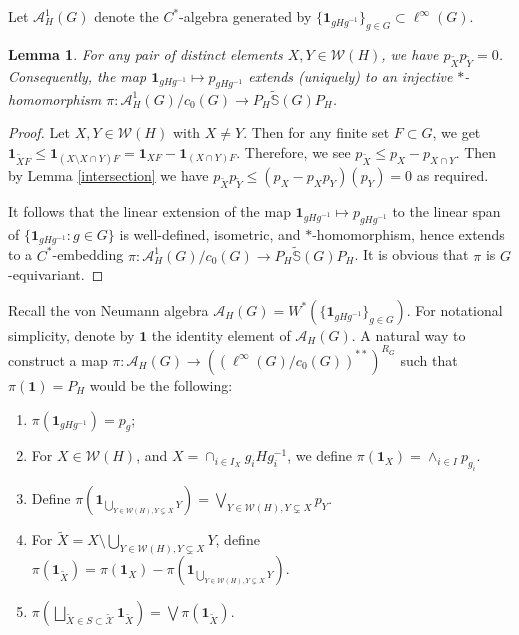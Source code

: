\documentclass[11pt]{amsart}
\newtheorem{lem}[thm]{Lemma}
\theoremstyle{definition}
\newcommand{\cX}{{\mathcal X}}
\begin{document}
 
Let $\mathcal{A}_{H}^{1}(G)$ denote the $C^*$-algebra generated by $\{ \mathbf{1}_{gHg^{-1}}\}_{g\in G}\subset \ell^\infty(G)$.   


\begin{lem}\label{pi extends}
For any pair of distinct elements $X,Y\in \mathcal{W}(H)$, we have $p_{\widetilde{X}}p_{\widetilde{Y}}=0$.
%
Consequently, the map $\mathbf{1}_{gHg^{-1}}\mapsto p_{gHg^{-1}}$ extends (uniquely) to an injective $*$-homomorphism $\pi: \mathcal{A}^{1}_H(G)/c_0(G)\to P_H\widetilde{\mathbb{S}}(G)P_H$.
\end{lem}
\begin{proof}
Let $X,Y\in \mathcal{W}(H)$ with $X\neq Y$. Then for any finite set $F\subset G$, we get  $\mathbf{1}_{\widetilde{X}F}\leq \mathbf{1}_{(X\setminus X\cap Y)F}=  \mathbf{1}_{XF}- \mathbf{1}_{(X\cap Y)F}$. Therefore, we see $p_{\widetilde{X}}\leq p_{X}- p_{X\cap Y}$.    Then by Lemma \ref{intersection} we have $p_{\widetilde{X}}p_{\widetilde{Y}}\leq (p_{X}-p_{X}p_{Y})(p_{Y})= 0$ as required.

It follows that the linear extension of the map $\mathbf{1}_{gHg^{-1}}\mapsto p_{gHg^{-1}}$ to the linear span of $\{\mathbf{1}_{gHg^{-1}}: g\in G\}$ is well-defined, isometric, and $*$-homomorphism, hence extends to a $C^*$-embedding $\pi: \mathcal{A}^{1}_H(G)/c_0(G)\to P_H\widetilde{\mathbb{S}}(G)P_H$.
It is obvious that $\pi$ is $G$-equivariant.
\end{proof}


Recall the von Neumann algebra $\mathcal{A}_H(G)= W^*(\{\mathbf{1}_{gHg^{-1}}\}_{g\in G})$. For notational simplicity, denote by $\mathbf{1}$ the identity element of $\mathcal{A}_H(G)$.  A natural way to construct a map $\pi: \mathcal{A}_H(G)\to
\left(\left(\ell^\infty(G)/c_0(G)\right)^{**}\right)^{R_G}$ such that $\pi(\mathbf{1})= P_{H}$ would be the following:


 

\begin{enumerate}
    \item $\pi(\mathbf{1}_{gHg^{-1}})= p_{g}$;
    \item For $X\in  \mathcal{W}(H)$, and $X=\cap_{i\in I_X} g_iHg_i^{-1}$, we define $\pi(\mathbf{1}_{X})=  \land_{i\in I} p_{g_i}$. 

    \item Define $\pi(\mathbf{1}_{\bigcup_{Y\in \mathcal{W}(H), Y\subsetneq X} Y})= \bigvee_{Y\in \mathcal{W}(H), Y\subsetneq X} p_{Y}$.
    \item For $\widetilde{X}= X\setminus \bigcup_{Y\in \mathcal{W}(H), Y\subsetneq X} Y$, define $\pi(\mathbf{1}_{\widetilde{X}})= \pi(\mathbf{1}_{X})-\pi(\mathbf{1}_{\bigcup_{Y\in \mathcal{W}(H), Y\subsetneq X} Y})$.
    \item $\pi(\bigsqcup_{\widetilde{X}\in S\subset \widetilde{\cX}} \mathbf{1}_{\widetilde{X}})= \bigvee \pi(\mathbf{1}_{\widetilde{X}})$. 
\end{enumerate}
\end{document}
